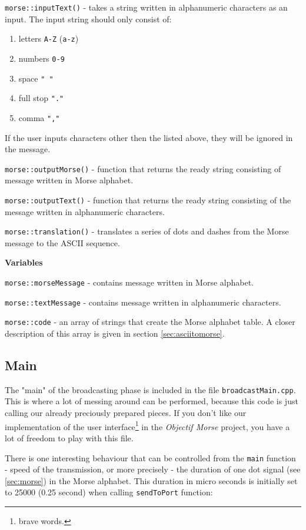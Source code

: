 \documentclass[12pt]{report}
\begin{document}
\verb|morse::inputText()| - takes a string written in alphanumeric characters as an input. The input string should only consist of:

\begin{enumerate}
\item letters \verb|A-Z| (\verb|a-z|)
\item numbers \verb|0-9|
\item space \verb|" "|
\item full stop \verb|"."|
\item comma \verb|","|
\end{enumerate}

If the user inputs characters other then the listed above, they will be ignored in the message.

\verb|morse::outputMorse()| - function that returns the ready string consisting of message written in Morse alphabet.

\verb|morse::outputText()| - function that returns the ready string consisting of the message written in alphanumeric characters.

\verb|morse::translation()| - translates a series of dots and dashes from the Morse message to the ASCII sequence.

\textbf{Variables}

\verb|morse::morseMessage| - contains message written in Morse alphabet.

\verb|morse::textMessage| - contains message written in alphanumeric characters.

\verb|morse::code| - an array of strings that create the Morse alphabet table. A closer description of this array is given in section \ref{sec:asciitomorse}.

\subsection{Main}

The "main" of the broadcasting phase is included in the file \verb|broadcastMain.cpp|. This is where a lot of messing around can be performed, because this code is just calling our already preciously prepared pieces. If you don't like our implementation of the user interface\footnote{brave words.} in the \textit{Objectif Morse} project, you have a lot of freedom to play with this file.

There is one interesting behaviour that can be controlled from the \verb|main| function - speed of the transmission, or more precisely - the duration of one dot signal (see \ref{sec:morse}) in the Morse alphabet. This duration in micro seconds is initially set to 25000 (0.25 second) when calling \verb|sendToPort| function: 
\end{document}
